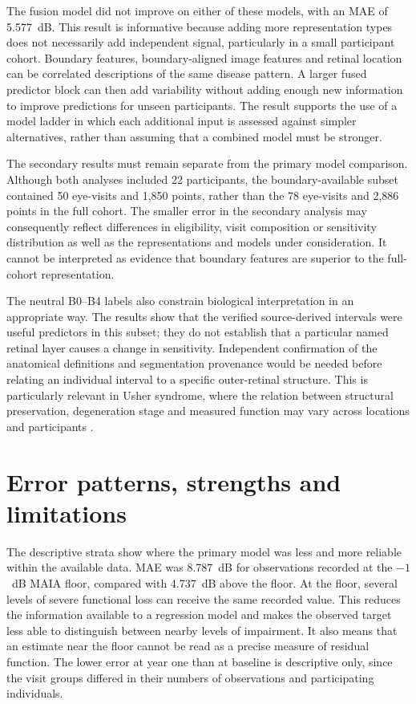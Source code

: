 The fusion model did not improve on either of these models, with an MAE of 5.577~dB. This result is informative because adding more representation types does not necessarily add independent signal, particularly in a small participant cohort. Boundary features, boundary-aligned image features and retinal location can be correlated descriptions of the same disease pattern. A larger fused predictor block can then add variability without adding enough new information to improve predictions for unseen participants. The result supports the use of a model ladder in which each additional input is assessed against simpler alternatives, rather than assuming that a combined model must be stronger.

The secondary results must remain separate from the primary model comparison. Although both analyses included 22 participants, the boundary-available subset contained 50 eye-visits and 1,850 points, rather than the 78 eye-visits and 2,886 points in the full cohort. The smaller error in the secondary analysis may consequently reflect differences in eligibility, visit composition or sensitivity distribution as well as the representations and models under consideration. It cannot be interpreted as evidence that boundary features are superior to the full-cohort representation.

The neutral B0--B4 labels also constrain biological interpretation in an appropriate way. The results show that the verified source-derived intervals were useful predictors in this subset; they do not establish that a particular named retinal layer causes a change in sensitivity. Independent confirmation of the anatomical definitions and segmentation provenance would be needed before relating an individual interval to a specific outer-retinal structure. This is particularly relevant in Usher syndrome, where the relation between structural preservation, degeneration stage and measured function may vary across locations and participants \citep{Gill2022,Loo2022}.

\section{Error patterns, strengths and limitations}

The descriptive strata show where the primary model was less and more reliable within the available data. MAE was 8.787~dB for observations recorded at the $-1$~dB MAIA floor, compared with 4.737~dB above the floor. At the floor, several levels of severe functional loss can receive the same recorded value. This reduces the information available to a regression model and makes the observed target less able to distinguish between nearby levels of impairment. It also means that an estimate near the floor cannot be read as a precise measure of residual function. The lower error at year one than at baseline is descriptive only, since the visit groups differed in their numbers of observations and participating individuals.

